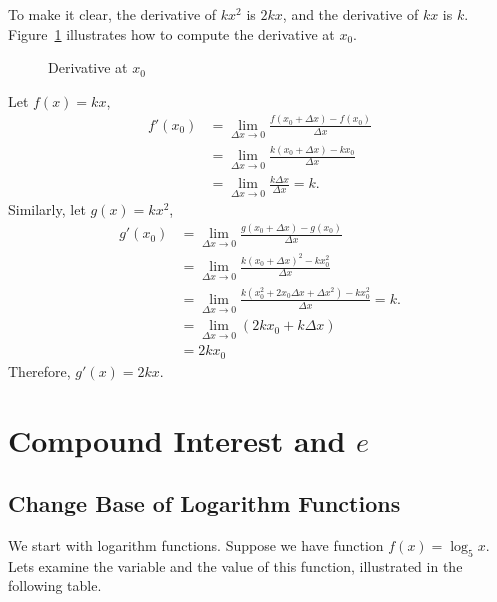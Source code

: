 \documentclass[11pt, oneside]{article}   	%
\begin{document}
To make it clear, the derivative of $kx^2$ is $2kx$, and the derivative of $kx$ is $k$.  Figure~\ref{fig:derivative} illustrates how to compute the derivative at $x_0$.
\begin{figure}
\centering
{}
\caption{Derivative at $x_0$}
\label{fig:derivative}
\end{figure}


Let $f(x)=kx$, 
\begin{align*}
f'(x_0) &=\lim_{\Delta x \rightarrow 0} \frac{f(x_0+\Delta x) - f(x_0)}{\Delta x}\\
&=\lim_{\Delta x \rightarrow 0} \frac{k(x_0+\Delta x) - kx_0}{\Delta x}\\
&=\lim_{\Delta x \rightarrow 0} \frac{k \Delta x}{\Delta x}=k.
\end{align*}
Similarly, let $g(x) = kx^2$,
\begin{align*}
g'(x_0) &=\lim_{\Delta x \rightarrow 0} \frac{g(x_0+\Delta x) - g(x_0)}{\Delta x}\\
&=\lim_{\Delta x \rightarrow 0} \frac{k(x_0+\Delta x)^2 - kx_0^2}{\Delta x}\\
&=\lim_{\Delta x \rightarrow 0} \frac{k(x_0^2+2x_0 \Delta x + \Delta x^2)-kx_0^2}{\Delta x}=k.\\
&=\lim_{\Delta x \rightarrow 0} (2k x_0+k \Delta x)\\
&=2kx_0
\end{align*}
Therefore, $g'(x)=2kx$.

\section{Compound Interest and $e$}
\subsection{Change Base of Logarithm Functions}
We start with logarithm functions. Suppose we have function $f(x)=\log_5x$. Lets examine the variable and the value of this function, illustrated in the following table.
\end{document}
